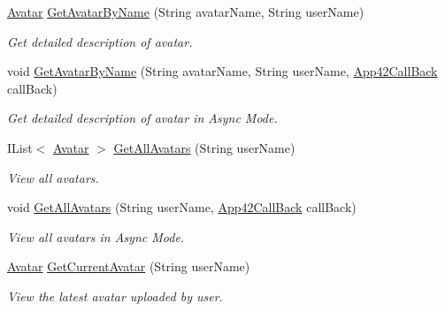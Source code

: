 \begin{DoxyCompactItemize}
\hyperlink{classcom_1_1shephertz_1_1app42_1_1paas_1_1sdk_1_1csharp_1_1avatar_1_1_avatar}{Avatar} \hyperlink{classcom_1_1shephertz_1_1app42_1_1paas_1_1sdk_1_1csharp_1_1avatar_1_1_avatar_service_adce34d5afe74171777e63128a9fc0692}{Get\+Avatar\+By\+Name} (String avatar\+Name, String user\+Name)
\begin{DoxyCompactList}\small\item\em Get detailed description of avatar. \end{DoxyCompactList}\item 
void \hyperlink{classcom_1_1shephertz_1_1app42_1_1paas_1_1sdk_1_1csharp_1_1avatar_1_1_avatar_service_a4a46f346d4c74eaa403e725600308849}{Get\+Avatar\+By\+Name} (String avatar\+Name, String user\+Name, \hyperlink{interfacecom_1_1shephertz_1_1app42_1_1paas_1_1sdk_1_1csharp_1_1_app42_call_back}{App42\+Call\+Back} call\+Back)
\begin{DoxyCompactList}\small\item\em Get detailed description of avatar in Async Mode. \end{DoxyCompactList}\item 
I\+List$<$ \hyperlink{classcom_1_1shephertz_1_1app42_1_1paas_1_1sdk_1_1csharp_1_1avatar_1_1_avatar}{Avatar} $>$ \hyperlink{classcom_1_1shephertz_1_1app42_1_1paas_1_1sdk_1_1csharp_1_1avatar_1_1_avatar_service_a7696b99befb1a6dd0be34ca64519e19b}{Get\+All\+Avatars} (String user\+Name)
\begin{DoxyCompactList}\small\item\em View all avatars. \end{DoxyCompactList}\item 
void \hyperlink{classcom_1_1shephertz_1_1app42_1_1paas_1_1sdk_1_1csharp_1_1avatar_1_1_avatar_service_a272354ee5c3c424b1a469e2cf342237a}{Get\+All\+Avatars} (String user\+Name, \hyperlink{interfacecom_1_1shephertz_1_1app42_1_1paas_1_1sdk_1_1csharp_1_1_app42_call_back}{App42\+Call\+Back} call\+Back)
\begin{DoxyCompactList}\small\item\em View all avatars in Async Mode. \end{DoxyCompactList}\item 
\hyperlink{classcom_1_1shephertz_1_1app42_1_1paas_1_1sdk_1_1csharp_1_1avatar_1_1_avatar}{Avatar} \hyperlink{classcom_1_1shephertz_1_1app42_1_1paas_1_1sdk_1_1csharp_1_1avatar_1_1_avatar_service_a49e49e789c64d7167a2141a09d099573}{Get\+Current\+Avatar} (String user\+Name)
\begin{DoxyCompactList}\small\item\em View the latest avatar uploaded by user. \end{DoxyCompactList}\item 

\end{DoxyCompactItemize}
